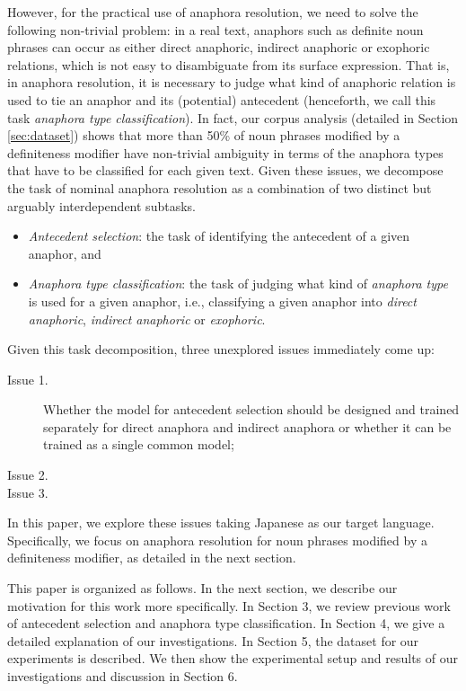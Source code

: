 \documentclass[english]{jnlp_1.4}
\newcommand{\wire}[1]{}
\begin{document}
However, for the practical use of anaphora resolution, we need to
solve the following non-trivial problem: in a real text, anaphors such
as definite noun phrases can occur as either direct anaphoric,
indirect anaphoric or exophoric relations, which is not easy to 
disambiguate from its surface expression. That is, in anaphora
resolution, it is necessary to judge what kind of anaphoric relation
is used to tie an anaphor and its (potential) antecedent (henceforth,
we call this task \emph{anaphora type classification}). In fact, our
corpus analysis (detailed in Section \ref{sec:dataset}) shows that
more than 50\% of noun phrases modified by a definiteness modifier
have non-trivial ambiguity in terms of the anaphora types that have
to be classified for each given text. Given these issues, we decompose
the task of nominal anaphora resolution as a combination of two
distinct but arguably interdependent subtasks.
\begin{itemize}
\item \emph{Antecedent selection}: the task of identifying the
  antecedent of a given anaphor, and
\item \emph{Anaphora type classification}: the task of judging what
  kind of \emph{anaphora type} is used for a given anaphor, i.e.,
  classifying a given anaphor into \emph{direct anaphoric},
  \emph{indirect anaphoric} or \emph{exophoric}.
\end{itemize}
Given this task decomposition, three unexplored issues immediately come up:
\begin{description}
\item[ Issue 1.]Whether the model for antecedent selection should be designed
  and trained separately for direct anaphora and indirect anaphora or
  whether it can be trained as a single common model;
\item[ Issue 2.]\wire{What contextual information is useful for determining each
  anaphora type;}
\item[ Issue 3.]\wire{How the two subtasks can be best combined (e.g. which subtask
  should be carried out first).}
\end{description}
In this paper, we explore these issues taking Japanese as our target
language. Specifically, we focus on anaphora resolution for noun
phrases modified by a definiteness modifier, as detailed in
the next section.

This paper is organized as follows. In the next section, we describe
our motivation for this work more specifically. In Section 3, we
review previous work of antecedent selection and anaphora type
classification. In Section 4, we give a detailed explanation of our
investigations. In Section 5, the dataset for our experiments is
described. We then show the experimental setup and results of our
investigations and discussion in Section 6. \wire{Finally, the
  conclusion is presented along with future work.}
\end{document}
